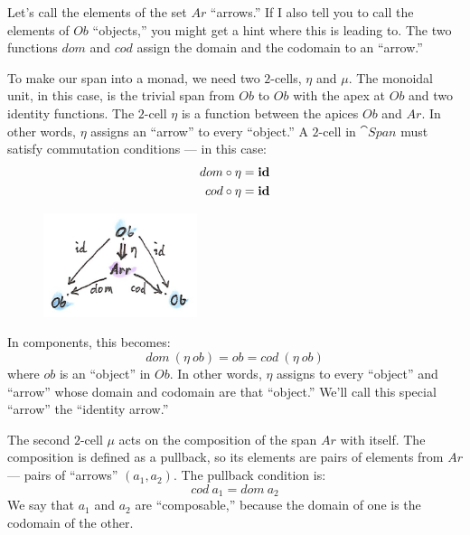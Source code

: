 \noindent
Let's call the elements of the set $Ar$ ``arrows.'' If I also
tell you to call the elements of $Ob$ ``objects,'' you might get
a hint where this is leading to. The two functions $dom$ and
$cod$ assign the domain and the codomain to an ``arrow.''

To make our span into a monad, we need two $2$-cells, $\eta$ and
$\mu$. The monoidal unit, in this case, is the trivial span from
$Ob$ to $Ob$ with the apex at $Ob$ and two identity
functions. The $2$-cell $\eta$ is a function between the apices
$Ob$ and $Ar$. In other words, $\eta$ assigns an
``arrow'' to every ``object.'' A $2$-cell in $\cat{Span}$ must satisfy
commutation conditions --- in this case:
\begin{align*}
dom &\circ \eta = \mathbf{id} \\
cod &\circ \eta = \mathbf{id}
\end{align*}

\begin{figure}[H]
\centering
\includegraphics[width=0.4\textwidth]{images/spanunit.png}
\end{figure}

\noindent
In components, this becomes:
\[dom\ (\eta\ ob) = ob = cod\ (\eta\ ob)\]
where $ob$ is an ``object'' in $Ob$. In other words,
$\eta$ assigns to every ``object'' and ``arrow'' whose domain and
codomain are that ``object.'' We'll call this special ``arrow'' the
``identity arrow.''

The second $2$-cell $\mu$ acts on the composition of the span
$Ar$ with itself. The composition is defined as a pullback, so
its elements are pairs of elements from $Ar$ --- pairs of
``arrows'' $(a_1, a_2)$. The pullback condition is:
\[cod\ a_1 = dom\ a_2\]
We say that $a_1$ and $a_2$ are ``composable,'' because the
domain of one is the codomain of the other.

